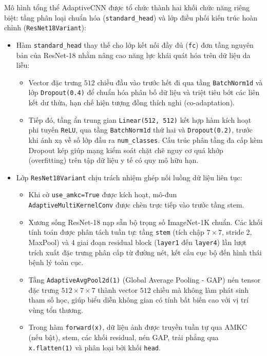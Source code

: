 Mô hình tổng thể AdaptiveCNN được tổ chức thành hai khối chức năng riêng biệt: tầng phân loại chuẩn hóa (\texttt{standard\_head}) và lớp điều phối kiến trúc hoàn chỉnh (\texttt{ResNet18Variant}):
\begin{itemize}
  \item Hàm \texttt{standard\_head} thay thế cho lớp kết nối đầy đủ (\texttt{fc}) đơn tầng nguyên bản của ResNet-18 nhằm nâng cao năng lực khái quát hóa trên dữ liệu da liễu:
  \begin{itemize}
    \item Vector đặc trưng $512$ chiều đầu vào trước hết đi qua tầng \texttt{BatchNorm1d} và lớp \texttt{Dropout(0.4)} để chuẩn hóa phân bố dữ liệu và triệt tiêu bớt các liên kết dư thừa, hạn chế hiện tượng đồng thích nghi (co-adaptation).
    \item Tiếp đó, tầng ẩn trung gian \texttt{Linear(512, 512)} kết hợp hàm kích hoạt phi tuyến \texttt{ReLU}, qua tầng \texttt{BatchNorm1d} thứ hai và \texttt{Dropout(0.2)}, trước khi ánh xạ về số lớp đầu ra \texttt{num\_classes}. Cấu trúc phân tầng đa cấp kèm Dropout kép giúp mạng kiểm soát chặt chẽ nguy cơ quá khớp (overfitting) trên tập dữ liệu y tế có quy mô hữu hạn.
  \end{itemize}
  \item Lớp \texttt{ResNet18Variant} chịu trách nhiệm ghép nối luồng dữ liệu liên tục:
  \begin{itemize}
    \item Khi cờ \texttt{use\_\allowbreak amkc=True} được kích hoạt, mô-đun \texttt{Adaptive\allowbreak MultiKernel\allowbreak Conv} được chèn trực tiếp vào trước tầng stem.
    \item Xương sống ResNet-18 nạp sẵn bộ trọng số ImageNet-1K chuẩn. Các khối tính toán được phân tách tuần tự: tầng \texttt{stem} (tích chập $7\times7$, stride 2, MaxPool) và 4 giai đoạn residual block (\texttt{layer1} đến \texttt{layer4}) lần lượt trích xuất đặc trưng phân cấp từ đường nét, kết cấu cục bộ đến hình thái bệnh lý toàn cục.
    \item Tầng \texttt{AdaptiveAvgPool2d(1)} (Global Average Pooling - GAP) nén tensor đặc trưng $512 \times 7 \times 7$ thành vector $512$ chiều mà không làm phát sinh tham số học, giúp biểu diễn không gian có tính bất biến cao với vị trí vùng tổn thương.
    \item Trong hàm \texttt{forward(x)}, dữ liệu ảnh được truyền tuần tự qua AMKC (nếu bật), stem, các khối residual, nén GAP, trải phẳng qua \texttt{x.flatten(1)} và phân loại bởi khối \texttt{head}.
  \end{itemize}
\end{itemize}



